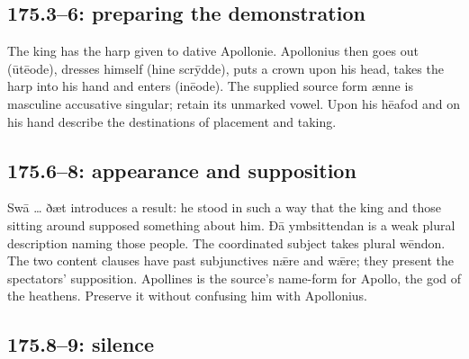 \subsection*{175.3–6: preparing the demonstration}

The king has the harp given to dative Apollonie. Apollonius then goes out (ūtēode), dresses himself (hine scrȳdde), puts a crown upon his head, takes the harp into his hand and enters (inēode). The supplied source form ænne is masculine accusative singular; retain its unmarked vowel. Upon his hēafod and on his hand describe the destinations of placement and taking.

\subsection*{175.6–8: appearance and supposition}

Swā … ðæt introduces a result: he stood in such a way that the king and those sitting around supposed something about him. Ðā ymbsittendan is a weak plural description naming those people. The coordinated subject takes plural wēndon. The two content clauses have past subjunctives nǣre and wǣre; they present the spectators’ supposition. Apollines is the source’s name-form for Apollo, the god of the heathens. Preserve it without confusing him with Apollonius.

\subsection*{175.8–9: silence}

